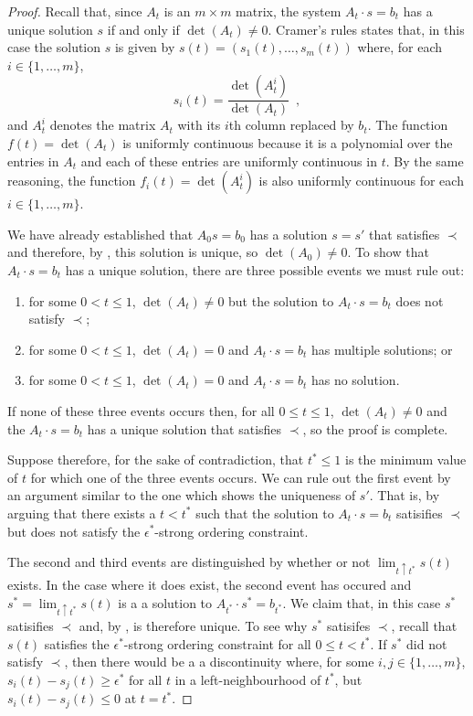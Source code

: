 \documentclass{patmorin}
\begin{document}
\begin{proof}
   Recall that, since $A_t$ is an $m\times m$ matrix, the system $A_t\cdot
   s=b_t$ has a unique solution $s$ if and only if $\det(A_t)\neq 0$.
   Cramer's rules states that, in this case the solution $s$ is given
   by $s(t)=(s_1(t),\ldots,s_m(t))$ where, for each $i\in\{1,\ldots,m\}$,
   \[ 
       s_i(t) = \frac{\det(A_t^i)}{\det(A_t)} \enspace ,
   \]
   and $A_t^i$ denotes the matrix $A_t$ with its $i$th column replaced
   by $b_t$. The function $f(t)=\det(A_t)$ is uniformly continuous
   because it is a polynomial over the entries in $A_t$ and each of
   these entries are uniformly continuous in $t$. By the same reasoning,
   the function $f_i(t)=\det(A_t^i)$ is also uniformly continuous for
   each $i\in\{1,\ldots,m\}$.

   We have already established that $A_0s=b_0$ has a solution $s=s'$
   that satisfies $\prec$ and therefore, by , this
   solution is unique, so $\det(A_0)\neq 0$.  To show that $A_t\cdot s=b_t$
   has a unique solution, there are three possible events we must rule out:
   \begin{enumerate}
     \item for some $0<t\le 1$, $\det(A_t)\neq 0$ but
           the solution to $A_t\cdot s=b_t$ does not satisfy $\prec$;
     \item for some $0<t\le 1$, $\det(A_t)=0$ and $A_t\cdot s=b_t$ has multiple 
           solutions; or
     \item for some $0<t\le 1$, $\det(A_t)=0$ and $A_t\cdot s=b_t$ has no solution.
   \end{enumerate}
   If none of these three events occurs then, for all $0\le t\le
   1$, $\det(A_t)\neq 0$ and the $A_t\cdot s=b_t$ has a unique solution that
   satisfies $\prec$, so the proof is complete.

   Suppose therefore, for the sake of contradiction, that $t^*\le 1$
   is the minimum value of $t$ for which one of the three events occurs.
   We can rule out the first event by an argument similar to the one which
   shows the uniqueness of $s'$.  That is, by arguing that there exists
   a $t<t^*$ such that the solution to $A_{t}\cdot s=b_{t}$ satisifies $\prec$
   but does not satisfy the $\epsilon^*$-strong ordering constraint.

   The second and third events are distinguished by whether or not
   $\lim_{t\uparrow t^*} s(t)$ exists.  In the case where it does
   exist, the second event has occured and $s^*=\lim_{t\uparrow t^*}
   s(t)$ is a a solution to $A_{t^*}\cdot s^*=b_{t^*}$.  We claim that,
   in this case $s^*$ satisifies $\prec$ and, by ,
   is therefore unique.  To see why $s^*$ satisifes $\prec$, recall
   that $s(t)$ satisfies the $\epsilon^*$-strong ordering constraint
   for all $0\le t<t^*$.  If $s^*$ did not satisfy $\prec$, then there
   would be a a discontinuity where, for some $i,j\in\{1,\ldots,m\}$,
   $s_i(t)-s_j(t)\ge \epsilon^*$ for all $t$ in a left-neighbourhood of
   $t^*$, but $s_i(t)-s_j(t) \le 0$ at $t=t^*$.


\end{proof}
\end{document}
